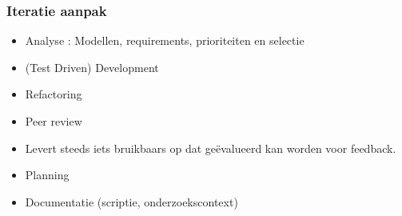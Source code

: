 \subsubsection{Iteratie aanpak}
\begin{itemize}
 \item Analyse : Modellen, requirements,  prioriteiten en selectie
 \item (Test Driven) Development
 \item Refactoring
 \item Peer review
 \item Levert steeds iets bruikbaars op dat ge\"evalueerd kan worden voor feedback.
 \item Planning
 \item Documentatie (scriptie, onderzoekscontext)
\end{itemize}
